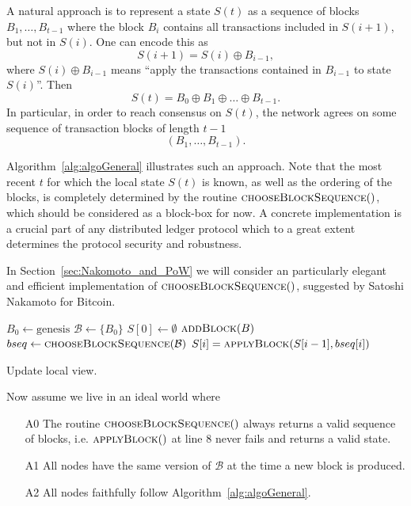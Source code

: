 \documentclass[a4paper]{article}
\begin{document}
A natural approach is to represent a state $S(t)$ as a sequence of blocks $B_1, \ldots, B_{t-1}$ where the block $B_i$  contains all transactions included in $S(i+1)$, but not in $S(i)$. One can encode this as
$$
S(i+1) = S(i) \oplus B_{i-1},
$$
where $S(i) \oplus B_{i-1}$ means ``apply the transactions contained in $B_{i-1}$ to state $S(i)$''. 
Then
$$
S(t) = B_0 \oplus B_{1} \oplus \ldots \oplus B_{t-1}.
$$
In particular, in order to reach consensus on $S(t)$, the network agrees on some sequence of transaction blocks of length $t-1$
$$
(B_1, \ldots, B_{t-1}).
$$

Algorithm~\ref{alg:algoGeneral} illustrates such an approach. Note that the most recent $t$ for which the local state $S(t)$ is known, as well as the ordering of the blocks, is completely determined by the routine $\Call{chooseBlockSequence}$, which should be considered as a block-box for now. A concrete implementation is a crucial part of any distributed ledger protocol which to a great extent determines the protocol security and robustness.

In Section~\ref{sec:Nakomoto_and_PoW} we will consider an particularly elegant and efficient implementation of $\Call{chooseBlockSequence}$, suggested by Satoshi Nakamoto for Bitcoin. 



\begin{algorithm} 
\begin{algorithmic}[1] 
\State $B_0 \gets \text{genesis}$
\State $\mathcal{B} \gets \{ B_0 \}$ 
\State $S[0] \gets \emptyset$ 
    	\State $\Call{addBlock}{B}$ 	
        \State $bseq \gets \Call{chooseBlockSequence}{\mathcal{B}}$ 
        	\State $S[i] = \Call{applyBlock}{S[i-1], bseq[i]}$
        \EndLoop
    \EndIf
\EndWhile
\end{algorithmic}
\caption{Update local view.}
\label{alg:algoGeneral}
\end{algorithm}

Now assume we live in an ideal world where
 
\begin{enumerate}
   \item[A0] The routine $\Call{chooseBlockSequence}$ always returns a valid sequence of blocks, i.e. $\Call{applyBlock}$ at line 8 never fails and returns a valid state.  
   
   \item[A1] All nodes have the same version of $\mathcal{B}$ at the time a new block is produced.
   
   \item[A2] All nodes faithfully follow Algorithm~\ref{alg:algoGeneral}.
  
\end{enumerate}
\end{document}
